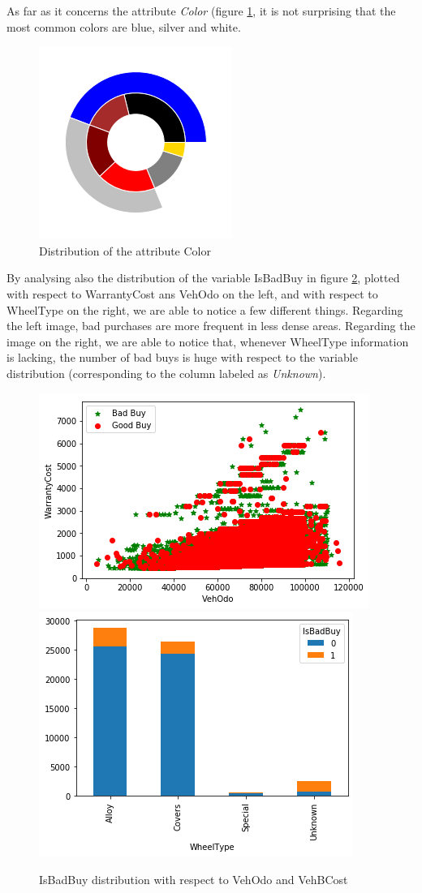 \documentclass{article}
\begin{document}
	
	
	As far as it concerns the attribute \emph{Color} (figure \ref{fig:color}, it is not surprising that the most common colors are blue, silver and white.
	\begin{figure}[H]
		\centering
		\includegraphics[width=.3\textwidth, height=.2\textheight, keepaspectratio]{color.png}
		\caption{{ Distribution of the attribute Color}}
		\label{fig:color}
	\end{figure}
	
	By analysing also the distribution of the variable IsBadBuy in figure \ref{fig:badbuys}, plotted with respect to WarrantyCost ans VehOdo on the left, and with respect to WheelType on the right, we are able to notice a few different things. Regarding the left image, bad purchases are more frequent in less dense areas. Regarding the image on the right, we are able to notice that, whenever WheelType information is lacking, the number of bad buys is huge with respect to the variable distribution (corresponding to the column labeled as \emph{Unknown}).
	
	\begin{figure}[H]
		\centering
		\includegraphics[width=.59\textwidth, keepaspectratio]{badbuys} \hfill
		\includegraphics[width=.39\textwidth, keepaspectratio]{wheeltype}
		\caption{IsBadBuy distribution with respect to VehOdo and VehBCost}
		\label{fig:badbuys}
	\end{figure}
	
\end{document}
